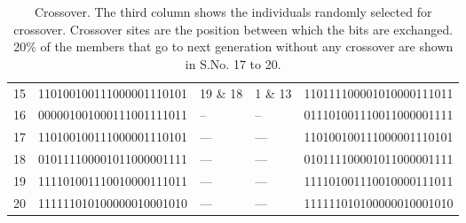 \begin{table}[htb]
\begin{tabular}{@{} l c p{1.5cm} p{1.5cm} c @{}}
    15 & 110100100111000001110101 & 19 \& 18 & 1 \& 13 & 	110111100001010000111011 \\
    
    16 & 000001001000111001111011 & -- & -- & 011101001110011000001111 \\
    
    17 & 110100100111000001110101 & --- & --- & 110100100111000001110101 \\
    
    18 & 010111100001011000001111 & --- & --- & 010111100001011000001111 \\
    
    19 & 111101001110010000111011 & --- & --- & 111101001110010000111011 \\
    
    20 & 111111010100000010001010 & --- & --- & 111111010100000010001010 \\

    \bottomrule
  \end{tabular}
  \caption{Crossover. The third column shows the individuals randomly selected for crossover. Crossover sites are the position between which the bits are exchanged. 20\% of the members that go to next generation without any crossover are shown in S.No. 17 to 20.}\label{table:5}
\end{table}

\pagebreak

